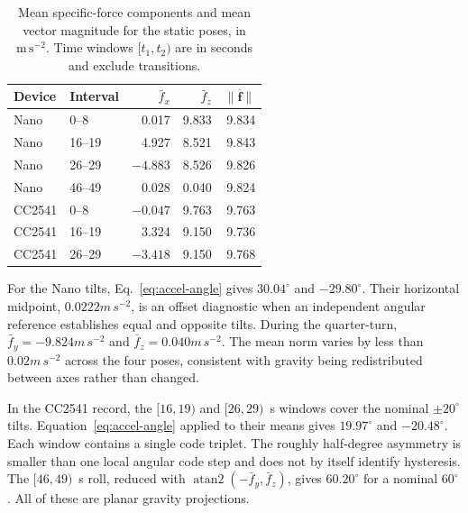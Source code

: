 \begin{table}[t]
\caption{Mean specific-force components and mean vector magnitude for the static poses, in $\mathrm{m\,s^{-2}}$. Time windows $[t_1,t_2)$ are in seconds and exclude transitions.}
\label{tab:accel-projections}
\centering\small
\begin{tabular}{@{}llrrr@{}}
\toprule
Device & Interval & $\bar f_x$ & $\bar f_z$ & $\overline{\|\bm f\|}$\\
\midrule
Nano & 0--8 & 0.017 & 9.833 & 9.834\\
Nano & 16--19 & 4.927 & 8.521 & 9.843\\
Nano & 26--29 & $-4.883$ & 8.526 & 9.826\\
Nano & 46--49 & 0.028 & 0.040 & 9.824\\
CC2541 & 0--8 & $-0.047$ & 9.763 & 9.763\\
CC2541 & 16--19 & 3.324 & 9.150 & 9.736\\
CC2541 & 26--29 & $-3.418$ & 9.150 & 9.768\\
\bottomrule
\end{tabular}
\end{table}

For the Nano tilts, Eq.~\ref{eq:accel-angle} gives $30.04^\circ$ and $-29.80^\circ$. Their horizontal midpoint, $0.0222\unit{m\,s^{-2}}$, is an offset diagnostic when an independent angular reference establishes equal and opposite tilts. During the quarter-turn, $\bar f_y=-9.824\unit{m\,s^{-2}}$ and $\bar f_z=0.040\unit{m\,s^{-2}}$. The mean norm varies by less than $0.02\unit{m\,s^{-2}}$ across the four poses, consistent with gravity being redistributed between axes rather than changed.

In the CC2541 record, the $[16,19)$ and $[26,29)$~s windows cover the nominal $\pm20^\circ$ tilts. Equation~\ref{eq:accel-angle} applied to their means gives $19.97^\circ$ and $-20.48^\circ$. Each window contains a single code triplet. The roughly half-degree asymmetry is smaller than one local angular code step and does not by itself identify hysteresis. The $[46,49)$~s roll, reduced with $\operatorname{atan2}(-\bar f_y,\bar f_z)$, gives $60.20^\circ$ for a nominal $60^\circ$. All of these are planar gravity projections.

